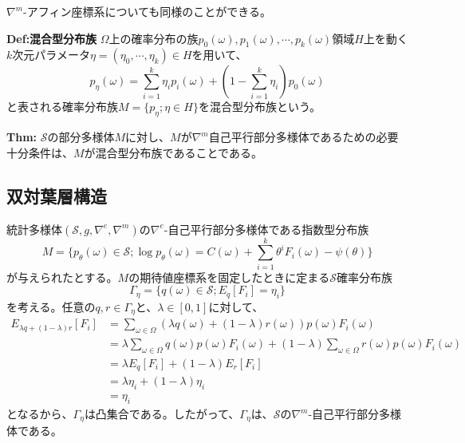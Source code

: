 \documentclass[a4paper,11pt]{jsarticle}
\numberwithin{equation}{section}
\begin{document}
$\nabla^{m}$-アフィン座標系についても同様のことができる。\\

\begin{itembox}[l]{\textbf{Def:混合型分布族}}
    $\Omega$上の確率分布の族$p_0(\omega),p_1(\omega),\cdots,p_k(\omega)$領域$H$上を動く$k$次元パラメータ$\eta = (\eta_0,\cdots,\eta_k) \in H$を用いて、
    \begin{equation}
        p_{\eta}(\omega) = \sum_{i=1}^{k} \eta_i p_i(\omega) + (1-\sum_{i=1}^{k} \eta_i) p_0(\omega)
    \end{equation}
    と表される確率分布族$M = \{p_{\eta};\eta \in H\}$を混合型分布族という。 

\end{itembox}

\begin{itembox}[l]{\textbf{Thm:}}
    $\mathcal{S}$の部分多様体$M$に対し、$M$が$\nabla^m$自己平行部分多様体であるための必要十分条件は、$M$が混合型分布族であることである。
\end{itembox}

\subsection{双対葉層構造}
統計多様体$(\mathcal{S},g,\nabla^{e},\nabla^{m})$の$\nabla^{e}$-自己平行部分多様体である指数型分布族
\begin{equation}
    M = \{p_{\theta}(\omega) \in \mathcal{S}; \log p_{\theta}(\omega) = C(\omega) + \sum_{i=1}^{k} \theta^i F_i(\omega) - \psi(\theta) \}
\end{equation}
が与えられたとする。$M$の期待値座標系を固定したときに定まる$\mathcal{S}$確率分布族
\begin{equation}
    \Gamma_{\eta} = \{q(\omega) \in \mathcal{S}; E_q [F_i] = \eta_i \}
\end{equation}
を考える。任意の$q,r \in \Gamma_{\eta}$と、$\lambda \in [0,1]$に対して、
\begin{align}
    E_{\lambda q + (1-\lambda)r}[F_i] &= \sum_{\omega \in \Omega} (\lambda q(\omega) + (1-\lambda)r(\omega)) p(\omega) F_i(\omega)\\
    &= \lambda \sum_{\omega \in \Omega} q(\omega) p(\omega) F_i(\omega) + (1-\lambda) \sum_{\omega \in \Omega} r(\omega) p(\omega) F_i(\omega)\\
    &= \lambda E_q[F_i] + (1-\lambda) E_r[F_i]\\
    &= \lambda \eta_i + (1-\lambda) \eta_i\\
    &= \eta_i
\end{align}
となるから、$\Gamma_{\eta}$は凸集合である。したがって、$\Gamma_{\eta}$は、$\mathcal{S}$の$\nabla^{m}$-自己平行部分多様体である。\\%
\end{document}
